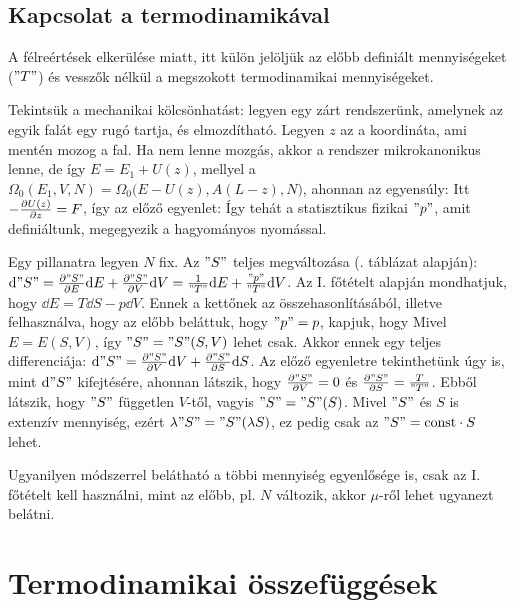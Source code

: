   \subsection{Kapcsolat a termodinamikával} 
   
   A félreértések elkerülése miatt, itt külön jelöljük az előbb definiált mennyiségeket ($"T"$) és vesszők nélkül a megszokott termodinamikai mennyiségeket. 
   
   Tekintsük a mechanikai kölcsönhatást: legyen egy zárt rendszerünk, amelynek az egyik falát egy rugó tartja, és elmozdítható. Legyen $z$ az a koordináta, ami mentén mozog a fal. Ha nem lenne mozgás, akkor a rendszer mikrokanonikus lenne, de így $E=E_1+U(z)$, mellyel a $\Omega_{0}(E_1,V,N)=\Omega_{0}\big(E-U(z),A(L-z),N\big)$, ahonnan az egyensúly:
   Itt $-\frac{\partial U(z)}{\partial z}=F$, így az előző egyenlet:
   Így tehát a statisztikus fizikai $"p"$, amit definiáltunk, megegyezik a hagyományos nyomással. 
   
   Egy pillanatra legyen $N$ fix. Az $"S"$ teljes megváltozása (. táblázat alapján): $\mathrm{d}"S"=\frac{\partial "S"}{\partial E}\mathrm{d} E+\frac{\partial "S"}{\partial V}\mathrm{d} V=\frac{1}{"T"}\mathrm{d} E+\frac{"p"}{"T"}\mathrm{d} V$. Az I. főtételt alapján mondhatjuk, hogy $\dd E=T\dd S-p\dd V$. Ennek a kettőnek az összehasonlításából, illetve felhasználva, hogy az előbb beláttuk, hogy $"p"=p$, kapjuk, hogy 
   Mivel $E=E(S,V)$, így $"S"="S"(S,V)$ lehet csak. Akkor ennek egy teljes differenciája: $\mathrm{d}"S"=\frac{\partial "S"}{\partial V}\mathrm{d} V+\frac{\partial "S"}{\partial S}\mathrm{d} S$. Az előző egyenletre tekinthetünk úgy is, mint $\mathrm{d} "S"$ kifejtésére, ahonnan látszik, hogy $\frac{\partial "S"}{\partial V}=0$ és $\frac{\partial "S"}{\partial S}=\frac{T}{"T"}$. Ebből látszik, hogy $"S"$ független $V$-től, vagyis $"S"="S"(S)$. Mivel $"S"$ és $S$ is extenzív mennyiség, ezért $\lambda"S"="S"(\lambda S)$, ez pedig csak az $"S"=\text{const}\cdot S$ lehet. 
   
   Ugyanilyen módszerrel belátható a többi mennyiség egyenlősége is, csak az I. főtételt kell használni, mint az előbb, pl. $N$ változik, akkor $\mu$-ről lehet ugyanezt belátni.
   
  \section{Termodinamikai összefüggések}
   
